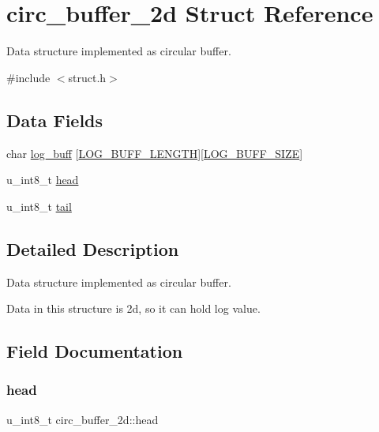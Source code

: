 \hypertarget{structcirc__buffer__2d}{}\section{circ\+\_\+buffer\+\_\+2d Struct Reference}
\label{structcirc__buffer__2d}


Data structure implemented as circular buffer.  




{\ttfamily \#include $<$struct.\+h$>$}

\subsection*{Data Fields}
\begin{DoxyCompactItemize}
\item 
char \hyperlink{structcirc__buffer__2d_a57d57a0a528f51cf12c93e44f2f2764f}{log\+\_\+buff} \mbox{[}\hyperlink{define_8h_ab476956b4e8a58961a140862e864f62f}{L\+O\+G\+\_\+\+B\+U\+F\+F\+\_\+\+L\+E\+N\+G\+TH}\mbox{]}\mbox{[}\hyperlink{define_8h_a287d5379960755c53cdc87c6ede35c48}{L\+O\+G\+\_\+\+B\+U\+F\+F\+\_\+\+S\+I\+ZE}\mbox{]}
\item 
u\+\_\+int8\+\_\+t \hyperlink{structcirc__buffer__2d_a3d5c07026cdc4ddb0799c2efdd5c77f0}{head}
\item 
u\+\_\+int8\+\_\+t \hyperlink{structcirc__buffer__2d_ab8e3951213b81cdfd770e7f3593f0cfe}{tail}
\end{DoxyCompactItemize}


\subsection{Detailed Description}
Data structure implemented as circular buffer. 

Data in this structure is 2d, so it can hold log value. 

\subsection{Field Documentation}
\mbox{\label{structcirc__buffer__2d_a3d5c07026cdc4ddb0799c2efdd5c77f0}} 
\subsubsection{\texorpdfstring{head}{head}}
{\footnotesize\ttfamily u\+\_\+int8\+\_\+t circ\+\_\+buffer\+\_\+2d\+::head}

